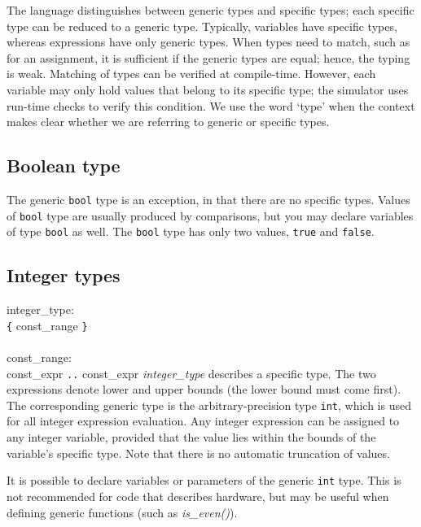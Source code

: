 The language distinguishes between generic types and specific types;
each specific type can be reduced to a generic type.
Typically, variables have specific types, whereas expressions have only
generic types. When types need to match, such as for an assignment, it
is sufficient if the generic types are equal; hence, the typing is weak.
Matching of types can be verified at compile-time.
However, each variable may only
hold values that belong to its specific type; the simulator uses run-time
checks to verify this condition. We use the word `type' when the context
makes clear whether we are referring to generic or specific types.


\subsection{Boolean type}\label{sec:bool}

The generic {\tt{}bool} type is an exception, in that there are no specific
types. Values of {\tt{}bool} type are usually produced by comparisons, but
you may declare variables of type {\tt{}bool} as well.
The {\tt{}bool} type has only two values, {\tt{}true} and {\tt{}false}.


\subsection{Integer types}\label{sec:int}

\grammarstart
integer\_type: \\
      \>\verb|{| const\_range \verb|}| \\
 \\
const\_range: \\
      \>const\_expr {\tt{}..} const\_expr
\grammarend
{\it{}integer\_type} describes a specific type.
The two expressions denote lower and upper bounds (the lower bound must
come first). The corresponding generic type is the arbitrary-precision
type {\tt{}int}, which is used for all integer expression evaluation.
Any integer expression can be assigned to any integer variable, provided
that the value lies within the bounds of the variable's specific type.
Note that there is no automatic truncation of values.

It is possible to declare variables or parameters of the generic {\tt{}int}
type. This is not recommended for code that describes hardware, but may be
useful when defining generic functions (such as {\it{}is\_even()}).


